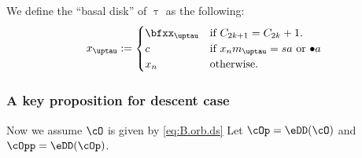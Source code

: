 \documentclass[ssunip]{subfiles}
\begin{document}
We define the  ``basal disk'' of $\uptau$ as the following:
\[
  x_{\uptau} :=\begin{cases}
    \bfxx_{\uptau} & \text{if $C_{2k+1}=C_{2k}+1$}.\\
    c & \text{if $x_{n}m_{\uptau} =sa$ or $\bullet a$}\\
    x_{n} & \text{otherwise}. %
  \end{cases}
\]


\subsubsection{A key proposition for descent case}
Now we assume $\cO$ is given by \eqref{eq:B.orb.ds}
Let $\cOp=\eDD(\cO)$ and $\cOpp=\eDD(\cOp)$.
\end{document}
